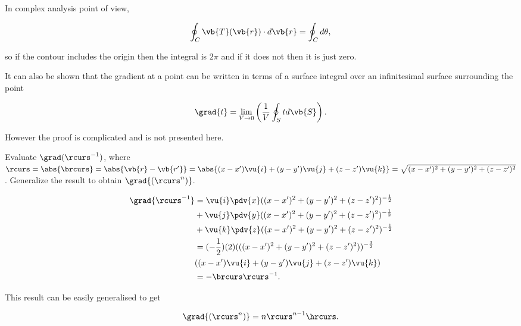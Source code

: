 \documentclass[english,a4paper,12pt]{report}
\begin{document}
In complex analysis point of view, 

\begin{equation}
	\oint_{C} \vb{T} (\vb{r} ) \cdot d\vb{r} = \oint_{C} d \theta , 
\end{equation}

so if the contour includes the origin then the integral is \(2\pi \) and if it does not then it is just zero. 



It can also be shown that the gradient at a point can be written in terms of a surface integral over an infinitesimal surface surrounding the point

\begin{equation}
	\grad{t } = \lim_{V \to 0} \left( \frac{1}{V} \oint_{S} t  d\vb{S}  \right).
\end{equation}

However the proof is complicated and is not presented here.

{Evaluate \(\grad({\rcurs ^{-1} })\), where \(\rcurs = \abs{\brcurs} = \abs{\vb{r} - \vb{r'}} = \abs{(x - x')\vu{i} + (y - y')\vu{j} + (z - z')\vu{k}} = \sqrt{(x-x')^2+(y-y')^2+(z-z')^2}\). Generalize the result to obtain \(\grad{(\rcurs^n)}\).}
{\begin{equation} 
	\begin{aligned} 
		\grad{\rcurs ^{-1} } &= \vu{i}\pdv{x}((x - x')^2 + (y - y')^2 + (z - z')^2)^{-\frac{1}{2}} \\ &+ \vu{j}\pdv{y}((x - x')^2 + (y - y')^2 + (z - z')^2)^{-\frac{1}{2}} \\ &+ \vu{k}\pdv{z}((x - x')^2 + (y - y')^2 + (z - z')^2)^{-\frac{1}{2}} \\ &= (-\frac{1}{2})(2)(((x - x')^2 + (y - y')^2 + (z - z')^2))^{-\frac{3}{2}} \\ &((x - x')\vu{i} + (y - y')\vu{j} + (z - z')\vu{k}) \\ &=- \brcurs \rcurs ^{-1} . 
	\end{aligned} 
\end{equation}
		
This result can be easily generalised to get
		
\begin{equation} 
	\grad{(\rcurs^n)} = n\rcurs^{n-1}\hrcurs. \label{gradrcurs} 
\end{equation}}
\end{document}
